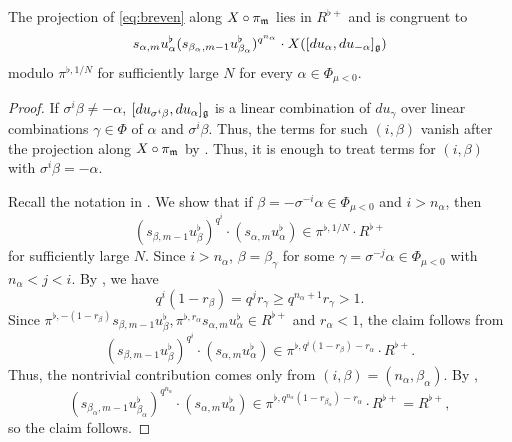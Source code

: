 \documentclass[12pt,reqno]{amsart}
\begin{document}
\begin{lem} \label{lem:expcompeven}
    The projection of \eqref{eq:breven} along $X \circ \pi_{{\mathfrak{m}}}$ lies in $R^{\flat +}$ and is congruent to
    \[
        s_{\alpha,m}u_\alpha^\flat (s_{\beta_\alpha,m-1}u_{\beta_\alpha}^\flat)^{q^{n_\alpha}} \cdot X([du_\alpha, du_{-\alpha}]_{{\mathfrak{g}}}) 
    \]
    modulo $\pi^{\flat, 1/N}$ for sufficiently large $N$ for every $\alpha \in \Phi_{\mu<0}$. 
\end{lem}
\begin{proof}
    If $\sigma^i\beta \neq - \alpha$, $[du_{\sigma^i\beta}, du_\alpha]_{{\mathfrak{g}}}$ is a linear combination of $du_\gamma$ over linear combinations $\gamma \in \Phi$ of $\alpha$ and $\sigma^i\beta$. Thus, the terms for such $(i, \beta)$ vanish after the projection along $X \circ \pi_{{\mathfrak{m}}}$ by . Thus, it is enough to treat terms for $(i, \beta)$ with $\sigma^i\beta = - \alpha$. 

    Recall the notation in . We show that if $\beta=-\sigma^{-i}\alpha \in \Phi_{\mu < 0}$ and $i>n_\alpha$, then
    \[
        (s_{\beta,m-1}u_\beta^\flat)^{q^i} \cdot (s_{\alpha,m}u_\alpha^\flat) \in \pi^{\flat, 1/N} \cdot R^{\flat+}
    \]
    for sufficiently large $N$. Since $i > n_\alpha$, $\beta = \beta_\gamma$ for some $\gamma = \sigma^{-j}\alpha \in \Phi_{\mu<0}$ with $n_\alpha < j < i$. 
    By , we have
    \[
        q^{i}(1-r_\beta) = q^{j}r_\gamma \geq q^{n_\alpha+1} r_\gamma > 1. 
    \]
    Since $\pi^{\flat, -(1-r_{\beta})} s_{\beta,m-1}u_{\beta}^\flat, \pi^{\flat, r_{\alpha}} s_{\alpha,m}u_\alpha^\flat \in R^{\flat +}$ and $r_{\alpha} < 1$, the claim follows from 
    \[
        (s_{\beta,m-1}u_\beta^\flat)^{q^i} \cdot (s_{\alpha,m}u_\alpha^\flat) \in \pi^{\flat, q^i(1-r_\beta) - r_{\alpha}} \cdot R^{\flat+}. 
    \]
    Thus, the nontrivial contribution comes only from $(i, \beta) = (n_\alpha, \beta_{\alpha})$. By , 
    \[
        (s_{\beta_\alpha,m-1}u_{\beta_\alpha}^\flat)^{q^{n_\alpha}} \cdot (s_{\alpha,m}u_\alpha^\flat) \in \pi^{\flat, q^{n_\alpha}(1-r_{\beta_\alpha}) - r_{\alpha}} \cdot R^{\flat+} = R^{\flat +}, 
    \]
    so the claim follows. %
\end{proof}
\end{document}

